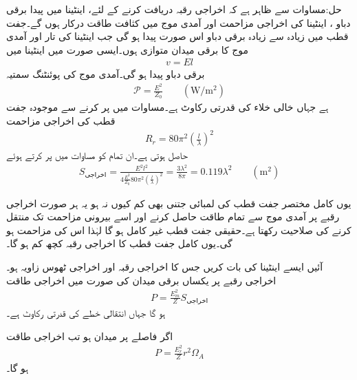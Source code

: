 حل:مساوات  سے ظاہر ہے کہ اخراجی رقبہ دریافت کرنے کے لئے، اینٹینا میں پیدا برقی دباو ، اینٹینا کی اخراجی مزاحمت  اور آمدی موج میں کثافت طاقت  درکار ہوں گے۔جفت قطب میں زیادہ سے زیادہ برقی دباو اس صورت پیدا ہو گی جب اینٹینا کی تار اور آمدی موج کا برقی میدان متوازی ہوں۔ایسی صورت میں اینٹینا میں
\begin{align}
v=E l
\end{align}
برقی دباو پیدا ہو گی۔آمدی موج کی پوئنٹنگ سمتیہ
\begin{align}
\mathscr{P}=\frac{E^2}{Z_0} \quad \quad (\si{\watt/ \meter \squared})
\end{align}
ہے جہاں  خالی خلاء کی قدرتی رکاوٹ ہے۔مساوات  میں  پر کرنے سے موجودہ جفت قطب کی اخراجی مزاحمت
\begin{align}
R_r=80 \pi^2 \left(\frac{l}{\lambda}\right)^2
\end{align}
حاصل ہوتی ہے۔ان تمام کو مساوات  میں پر کرتے ہوئے
\begin{align}
S_{\text{اخراجی}} = \frac{E^2 l^2}{4 \frac{E^2}{Z_0} 80 \pi^2 \left(\frac{l}{\lambda}\right)^2  }=\frac{3\lambda^2}{8\pi}=0.119 \lambda^2 \quad \quad (\si{\meter \squared})
\end{align}

یوں کامل مختصر جفت قطب کی لمبائی جتنی بھی کم کیوں نہ ہو یہ ہر صورت  اخراجی رقبے پر آمدی موج سے تمام طاقت حاصل کرنے اور اسے بیرونی مزاحمت تک منتقل کرنے کی صلاحیت رکھتا ہے۔حقیقی جفت قطب غیر کامل ہو گا  لہٰذا اس کی مزاحمت  ہو گی۔یوں کامل جفت قطب کا اخراجی رقبہ کچھ کم ہو گا۔

آئیں ایسے اینٹینا کی بات کریں جس کا اخراجی رقبہ  اور اخراجی ٹھوس زاویہ  ہو۔اخراجی رقبے پر یکساں برقی میدان  کی صورت میں اخراجی طاقت
\begin{align}
P=\frac{E_m^2}{Z} S_{\text{اخراجی}}
\end{align}
ہو گا جہاں  انتقالی خطے کی قدرتی رکاوٹ ہے۔

اگر  فاصلے پر میدان  ہو تب اخراجی طاقت
\begin{align}
P=\frac{E_r^2}{Z} r^2 \Omega_A
\end{align}
ہو گا۔ 


